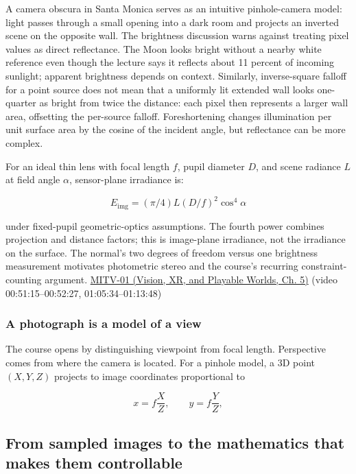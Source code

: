 A camera obscura in Santa Monica serves as an intuitive pinhole-camera model: light passes through a small opening into a dark room and projects an inverted scene on the opposite wall. The brightness discussion warns against treating pixel values as direct reflectance. The Moon looks bright without a nearby white reference even though the lecture says it reflects about 11 percent of incoming sunlight; apparent brightness depends on context. Similarly, inverse-square falloff for a point source does not mean that a uniformly lit extended wall looks one-quarter as bright from twice the distance: each pixel then represents a larger wall area, offsetting the per-source falloff. Foreshortening changes illumination per unit surface area by the cosine of the incident angle, but reflectance can be more complex.

For an ideal thin lens with focal length \(f\), pupil diameter \(D\), and scene radiance \(L\) at field angle \(\alpha\), sensor-plane irradiance is:

\[E_{\mathrm{img}}=(\pi/4)L(D/f)^2\cos^4\alpha\]

under fixed-pupil geometric-optics assumptions. The fourth power combines projection and distance factors; this is image-plane irradiance, not the irradiance on the surface. The normal's two degrees of freedom versus one brightness measurement motivates photometric stereo and the course's recurring constraint-counting argument. \href{../07-Vision-XR-and-Playable-Worlds/main.pdf\#nameddest=04-visual-computing-ii-ch036-mitv-01---introduction-to-machine-vision}{MITV-01 (Vision, XR, and Playable Worlds, Ch. 5)} (video 00:51:15--00:52:27, 01:05:34--01:13:48)

\subsubsection{A photograph is a model of a view}\label{03-visual-computing-i-ch001-a-photograph-is-a-model-of-a-view}

\hypertarget{03-visual-computing-i-ch001-a-photograph-is-a-model-of-a-view}{}

The course opens by distinguishing viewpoint from focal length. Perspective comes from where the camera is located. For a pinhole model, a 3D point \((X,Y,Z)\) projects to image coordinates proportional to

\[
x=f\frac{X}{Z},\qquad y=f\frac{Y}{Z},
\]

\subsection{From sampled images to the mathematics that makes them controllable}\label{03-visual-computing-i-ch001-from-sampled-images-to-the-mathematics-that-makes-them-controllable}

